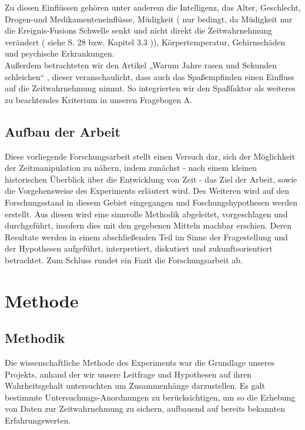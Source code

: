 \documentclass{Paper}
\begin{document}
Zu diesen Einflüssen gehören unter anderem die Intelligenz, das Alter, Geschlecht, Drogen-und Medikamenteneinflüsse, Müdigkeit ( nur bedingt, da Müdigkeit nur die Ereignis-Fusions Schwelle senkt und nicht direkt die Zeitwahrnehmung verändert ( siehe S. 28 bzw. Kapitel 3.3 )), Körpertemperatur, Gehirnschäden und psychische Erkrankungen.
\\Außerdem betrachteten wir den Artikel „Warum Jahre rasen und Sekunden schleichen“ , dieser veranschaulicht, dass auch das Spaßempfinden einen Einfluss auf die Zeitwahrnehmung nimmt. So integrierten wir den Spaßfaktor als weiteres zu beachtendes Kriterium in unseren Fragebogen A.


\subsection{Aufbau der Arbeit}
Diese vorliegende Forschungsarbeit stellt einen Versuch dar, sich der Möglichkeit der Zeitmanipulation zu nähern, indem zunächst - nach einem kleinen historischen Überblick über die Entwicklung von Zeit - das Ziel der Arbeit, sowie die Vorgehensweise des Experiments erläutert wird. Des Weiteren wird auf den Forschungsstand in diesem Gebiet eingegangen und Foschungshypothesen werden erstellt. Aus diesen wird eine sinnvolle Methodik abgeleitet, vorgeschlagen und durchgeführt, insofern dies mit den gegebenen Mitteln machbar erschien. Deren Resultate werden in einem abschließenden Teil im Sinne der Fragestellung und der Hypothesen aufgeführt, interpretiert, diskutiert und zukunftsorientiert betrachtet. Zum Schluss rundet ein Fazit die Forschungsarbeit ab.



 
	
\section{Methode}
	\subsection{Methodik}
	\par
		Die wissenschaftliche Methode des Experiments war die Grundlage unseres Projekts, anhand der wir unsere Leitfrage und Hypothesen auf ihren Wahrheitsgehalt untersuchten um Zusammenhänge darzustellen.
		Es galt bestimmte Untersuchungs-Anordnungen zu berücksichtigen, um so die Erhebung von Daten zur Zeitwahrnehmung zu sichern, aufbauend auf bereits bekannten Erfahrungswerten.
		
\end{document}
